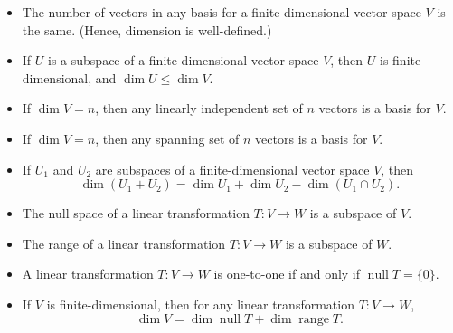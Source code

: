\documentclass[12pt,letterpaper]{article}
\DeclareMathOperator{\spn}{span}
\DeclareMathOperator{\nul}{null}
\DeclareMathOperator{\range}{range}
\begin{document}
\begin{itemize}
{\bf Note:} In particular, this means that if $B_U=\{u_1,\ldots, u_m\}$ is a basis for a subspace $U\subseteq V$, then $B_U$ is linearly independent, and therefore can be extended to a basis $B_V = \{u_1,\ldots, u_m,w_1,\ldots, w_k\}$. Moreover, if we define $W=\spn\{w_1,\ldots, w_k\}$ to be the subspace of $V$ spanned by the vectors we used to extend $B_U$ to $B_V$, then $W$ is a complementary subspace to $U$, in the sense that $V=U\oplus W$.
\item The number of vectors in any basis for a finite-dimensional vector space $V$ is the same. (Hence, dimension is well-defined.)
\item If $U$ is a subspace of a finite-dimensional vector space $V$, then $U$ is finite-dimensional, and $\dim U\leq \dim V$.
\item If $\dim V=n$, then any linearly independent set of $n$ vectors is a basis for $V$.
\item If $\dim V = n$, then any spanning set of $n$ vectors is a basis for $V$.
\item If $U_1$ and $U_2$ are subspaces of a finite-dimensional vector space $V$, then 
\[
\dim (U_1+U_2) = \dim U_1+\dim U_2-\dim(U_1\cap U_2).
\]
\item The null space of a linear transformation $T:V\to W$  is a subspace of $V$.
\item The range of a linear transformation $T:V\to W$ is a subspace of $W$.
\item A linear transformation $T:V\to W$ is one-to-one if and only if $\nul T = \{0\}$.
\item If $V$ is finite-dimensional, then for any linear transformation $T:V\to W$,
\[
\dim V = \dim \nul T + \dim \range T.
\]
\end{itemize}
\end{document}
